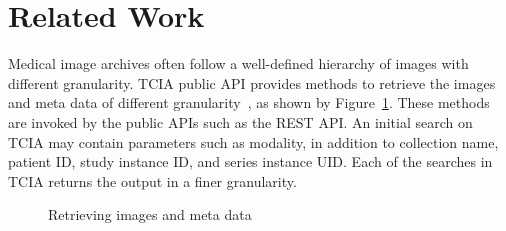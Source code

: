\documentclass[conference]{IEEEtran}
\begin{document}
%
\section{Related Work}

Medical image archives often follow a well-defined hierarchy of images with different granularity. TCIA public API provides methods to retrieve the images and meta data of different granularity~\cite{prior2013tcia}, as shown by Figure~\ref{fig:methods}. These methods are invoked by the public APIs such as the REST API. An initial search on TCIA may contain parameters such as modality, in addition to collection name, patient ID, study instance ID, and series instance UID. Each of the searches in TCIA returns the output in a finer granularity.

\begin{figure}[!h]
	\begin{center}
\vspace{-10pt}

	\end{center}
	\caption{Retrieving images and meta data}
	\label{fig:methods}
\vspace{-15pt}
\end{figure}
\end{document}
